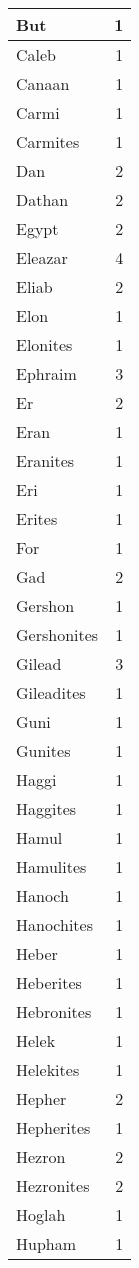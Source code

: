 \begin{center}
\begin{longtable}{l|r}
But & 1\\ \hline 
Caleb & 1\\ \hline 
Canaan & 1\\ \hline 
Carmi & 1\\ \hline 
Carmites & 1\\ \hline 
Dan & 2\\ \hline 
Dathan & 2\\ \hline 
Egypt & 2\\ \hline 
Eleazar & 4\\ \hline 
Eliab & 2\\ \hline 
Elon & 1\\ \hline 
Elonites & 1\\ \hline 
Ephraim & 3\\ \hline 
Er & 2\\ \hline 
Eran & 1\\ \hline 
Eranites & 1\\ \hline 
Eri & 1\\ \hline 
Erites & 1\\ \hline 
For & 1\\ \hline 
Gad & 2\\ \hline 
Gershon & 1\\ \hline 
Gershonites & 1\\ \hline 
Gilead & 3\\ \hline 
Gileadites & 1\\ \hline 
Guni & 1\\ \hline 
Gunites & 1\\ \hline 
Haggi & 1\\ \hline 
Haggites & 1\\ \hline 
Hamul & 1\\ \hline 
Hamulites & 1\\ \hline 
Hanoch & 1\\ \hline 
Hanochites & 1\\ \hline 
Heber & 1\\ \hline 
Heberites & 1\\ \hline 
Hebronites & 1\\ \hline 
Helek & 1\\ \hline 
Helekites & 1\\ \hline 
Hepher & 2\\ \hline 
Hepherites & 1\\ \hline 
Hezron & 2\\ \hline 
Hezronites & 2\\ \hline 
Hoglah & 1\\ \hline 
Hupham & 1\\ \hline 

\end{longtable}
\end{center}
